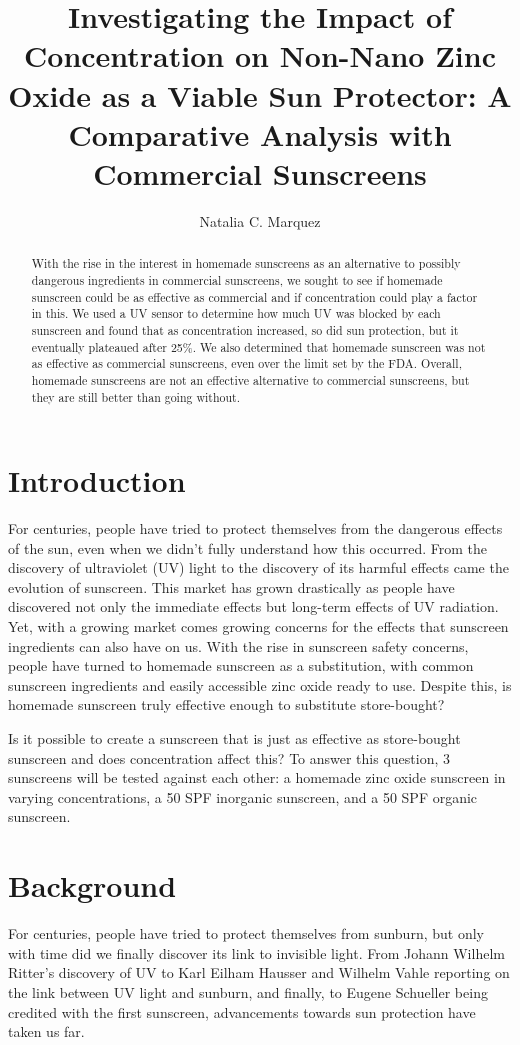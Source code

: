 \documentclass{article}
\title{Investigating the Impact of Concentration on Non-Nano Zinc Oxide as a Viable Sun Protector: A Comparative Analysis with Commercial Sunscreens}
\author[1$\dag$]{Natalia C. Marquez}
\affil[1]{The Institute for Computing in Research, Santa Fe, New Mexico, The United States.}
\affil[*]{Address correspondence to: ncmarquez51@gmail.com}
\affil[$\dag$]{}
\date{}
\begin{document}
\maketitle

\begin{abstract}
With the rise in the interest in homemade sunscreens as an alternative to possibly dangerous ingredients in commercial sunscreens, we sought to see if homemade sunscreen could be as effective as commercial and if concentration could play a factor in this. We used a UV sensor to determine how much UV was blocked by each sunscreen and found that as concentration increased, so did sun protection, but it eventually plateaued after 25\%. We also determined that homemade sunscreen was not as effective as commercial sunscreens, even over the limit set by the FDA. Overall, homemade sunscreens are not an effective alternative to commercial sunscreens, but they are still better than going without.

\end{abstract}


\section{Introduction}
For centuries, people have tried to protect themselves from the dangerous effects of the sun, even when we didn’t fully understand how this occurred. From the discovery of ultraviolet (UV) light to the discovery of its harmful effects came the evolution of sunscreen. This market has grown drastically as people have discovered not only the immediate effects but long-term effects of UV radiation. Yet, with a growing market comes growing concerns for the effects that sunscreen ingredients can also have on us. With the rise in sunscreen safety concerns, people have turned to homemade sunscreen as a substitution, with common sunscreen ingredients and easily accessible zinc oxide ready to use. Despite this, is homemade sunscreen truly effective enough to substitute store-bought? 

Is it possible to create a sunscreen that is just as effective as store-bought sunscreen and does concentration affect this? To answer this question, 3 sunscreens will be tested against each other: a homemade zinc oxide sunscreen in varying concentrations, a 50 SPF inorganic sunscreen, and a 50 SPF organic sunscreen.


\section{Background}
  For centuries, people have tried to protect themselves from sunburn, but only with time did we finally discover its link to invisible light. From Johann Wilhelm Ritter’s discovery of UV to Karl Eilham Hausser and Wilhelm Vahle reporting on the link between UV light and sunburn, and finally, to Eugene Schueller being credited with the first sunscreen, advancements towards sun protection have taken us far.
\end{document}

